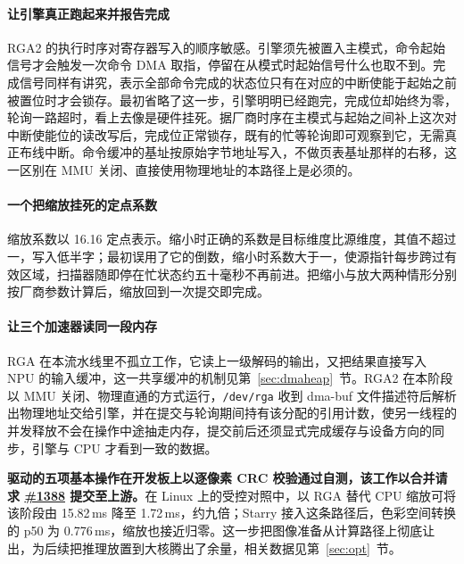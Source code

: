 \paragraph{让引擎真正跑起来并报告完成}
RGA2 的执行时序对寄存器写入的顺序敏感。引擎须先被置入主模式，命令起始信号才会触发一次命令 DMA 取指，停留在从模式时起始信号什么也取不到。完成信号同样有讲究，表示全部命令完成的状态位只有在对应的中断使能于起始之前被置位时才会锁存。最初省略了这一步，引擎明明已经跑完，完成位却始终为零，轮询一路超时，看上去像是硬件挂死。据厂商时序在主模式与起始之间补上这次对中断使能位的读改写后，完成位正常锁存，既有的忙等轮询即可观察到它，无需真正布线中断。命令缓冲的基址按原始字节地址写入，不做页表基址那样的右移，这一区别在 MMU 关闭、直接使用物理地址的本路径上是必须的。

\paragraph{一个把缩放挂死的定点系数}
缩放系数以 16.16 定点表示。缩小时正确的系数是目标维度比源维度，其值不超过一，写入低半字；最初误用了它的倒数，缩小时系数大于一，使源指针每步跨过有效区域，扫描器随即停在忙状态约五十毫秒不再前进。把缩小与放大两种情形分别按厂商参数计算后，缩放回到一次提交即完成。

\paragraph{让三个加速器读同一段内存}
RGA 在本流水线里不孤立工作，它读上一级解码的输出，又把结果直接写入 NPU 的输入缓冲，这一共享缓冲的机制见第~\ref{sec:dmaheap}~节。RGA2 在本阶段以 MMU 关闭、物理直通的方式运行，\texttt{/dev/rga} 收到 dma-buf 文件描述符后解析出物理地址交给引擎，并在提交与轮询期间持有该分配的引用计数，使另一线程的并发释放不会在操作中途抽走内存，提交前后还须显式完成缓存与设备方向的同步，引擎与 CPU 才看到一致的数据。

\textbf{驱动的五项基本操作在开发板上以逐像素 CRC 校验通过自测，该工作以合并请求 \href{https://github.com/rcore-os/tgoskits/pull/1388}{\#1388} 提交至上游。}在 Linux 上的受控对照中，以 RGA 替代 CPU 缩放可将该阶段由 15.82\,ms 降至 1.72\,ms，约九倍；Starry 接入这条路径后，色彩空间转换的 p50 为 0.776\,ms，缩放也接近归零。这一步把图像准备从计算路径上彻底让出，为后续把推理放置到大核腾出了余量，相关数据见第~\ref{sec:opt}~节。
